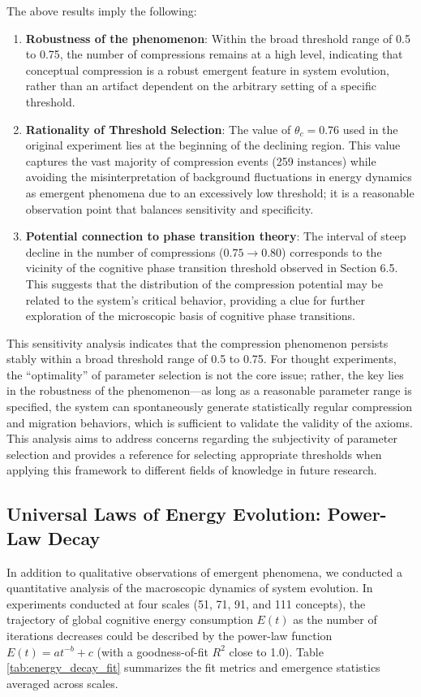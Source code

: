 \documentclass[10pt,onecolumn]{article}
\begin{document}
The above results imply the following:
\begin{enumerate}
    \item \textbf{Robustness of the phenomenon}: Within the broad threshold range of 0.5 to 0.75, the number of compressions remains at a high level, indicating that conceptual compression is a robust emergent feature in system evolution, rather than an artifact dependent on the arbitrary setting of a specific threshold.
    \item \textbf{Rationality of Threshold Selection}: The value of $\theta_c = 0.76$ used in the original experiment lies at the beginning of the declining region. This value captures the vast majority of compression events (259 instances) while avoiding the misinterpretation of background fluctuations in energy dynamics as emergent phenomena due to an excessively low threshold; it is a reasonable observation point that balances sensitivity and specificity.
    \item \textbf{Potential connection to phase transition theory}: The interval of steep decline in the number of compressions ($0.75 \to 0.80$) corresponds to the vicinity of the cognitive phase transition threshold observed in Section 6.5. This suggests that the distribution of the compression potential may be related to the system’s critical behavior, providing a clue for further exploration of the microscopic basis of cognitive phase transitions.
\end{enumerate}

This sensitivity analysis indicates that the compression phenomenon persists stably within a broad threshold range of 0.5 to 0.75. For thought experiments, the “optimality” of parameter selection is not the core issue; rather, the key lies in the robustness of the phenomenon—as long as a reasonable parameter range is specified, the system can spontaneously generate statistically regular compression and migration behaviors, which is sufficient to validate the validity of the axioms. This analysis aims to address concerns regarding the subjectivity of parameter selection and provides a reference for selecting appropriate thresholds when applying this framework to different fields of knowledge in future research.

\subsection{Universal Laws of Energy Evolution: Power-Law Decay}

In addition to qualitative observations of emergent phenomena, we conducted a quantitative analysis of the macroscopic dynamics of system evolution. In experiments conducted at four scales (51, 71, 91, and 111 concepts), the trajectory of global cognitive energy consumption $E(t)$ as the number of iterations decreases could be described by the power-law function $E(t) = a t^{-b} + c$ (with a goodness-of-fit $R^2$ close to 1.0). Table \ref{tab:energy_decay_fit} summarizes the fit metrics and emergence statistics averaged across scales.
\end{document}
